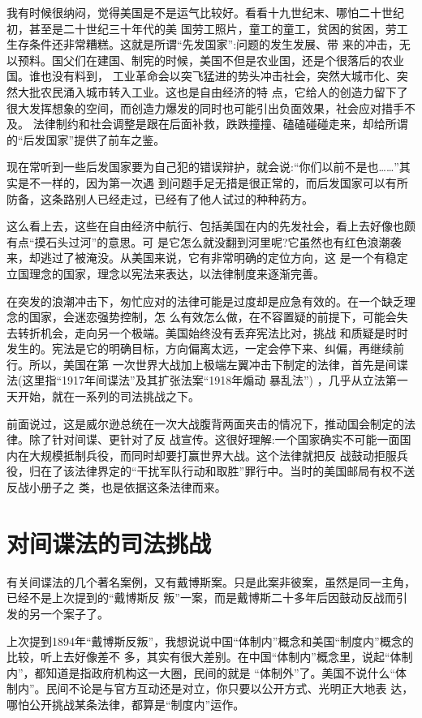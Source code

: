 \documentclass[10pt]{article}
\begin{document}
{我有时候很纳闷，觉得美国是不是运气比较好。看看十九世纪末、哪怕二十世纪初，甚至是二十世纪三十年代的美
国劳工照片，童工的童工，贫困的贫困，劳工生存条件还非常糟糕。这就是所谓``先发国家'':问题的发生发展、带
来的冲击，无以预料。国父们在建国、制宪的时候，美国不但是农业国，还是个很落后的农业国。谁也没有料到，
工业革命会以突飞猛进的势头冲击社会，突然大城市化、突然大批农民涌入城市转入工业。这也是自由经济的特
点，它给人的创造力留下了很大发挥想象的空间，而创造力爆发的同时也可能引出负面效果，社会应对措手不及。
法律制约和社会调整是跟在后面补救，跌跌撞撞、磕磕碰碰走来，却给所谓的``后发国家''提供了前车之鉴。

现在常听到一些后发国家要为自己犯的错误辩护，就会说:``你们以前不是也……''其实是不一样的，因为第一次遇
到问题手足无措是很正常的，而后发国家可以有所防备，这条路别人已经走过，已经有了他人试过的种种药方。

这么看上去，这些在自由经济中航行、包括美国在内的先发社会，看上去好像也颇有点``摸石头过河''的意思。可
是它怎么就没翻到河里呢?它虽然也有红色浪潮袭来，却逃过了被淹没。从美国来说，它有非常明确的定位方向，这
是一个有稳定立国理念的国家，理念以宪法来表达，以法律制度来逐渐完善。

在突发的浪潮冲击下，匆忙应对的法律可能是过度却是应急有效的。在一个缺乏理念的国家，会迷恋强势控制，怎
么有效怎么做，在不容置疑的前提下，可能会失去转折机会，走向另一个极端。美国始终没有丢弃宪法比对，挑战
和质疑是时时发生的。宪法是它的明确目标，方向偏离太远，一定会停下来、纠偏，再继续前行。所以，美国在第
一次世界大战加上极端左翼冲击下制定的法律，首先是间谍法(这里指``1917年间谍法''及其扩张法案``1918年煽动
暴乱法'') ，几乎从立法第一天开始，就在一系列的司法挑战之下。

前面说过，这是威尔逊总统在一次大战腹背两面夹击的情况下，推动国会制定的法律。除了针对间谍、更针对了反
战宣传。这很好理解:一个国家确实不可能一面国内在大规模抵制兵役，而同时却要打赢世界大战。这个法律就把反
战鼓动拒服兵役，归在了该法律界定的``干扰军队行动和取胜''罪行中。当时的美国邮局有权不送反战小册子之
类，也是依据这条法律而来。

\pagebreak
\section{对间谍法的司法挑战}

有关间谍法的几个著名案例，又有戴博斯案。只是此案非彼案，虽然是同一主角，已经不是上次提到的``戴博斯反
叛''一案，而是戴博斯二十多年后因鼓动反战而引发的另一个案子了。

上次提到1894年``戴博斯反叛''，我想说说中国``体制内''概念和美国``制度内''概念的比较，听上去好像差不
多，其实有很大差别。在中国``体制内''概念里，说起``体制内''，都知道是指政府机构这一大圈，民间的就是
``体制外''了。美国不说什么``体制内''。民间不论是与官方互动还是对立，你只要以公开方式、光明正大地表
达，哪怕公开挑战某条法律，都算是``制度内''运作。

}
\end{document}
